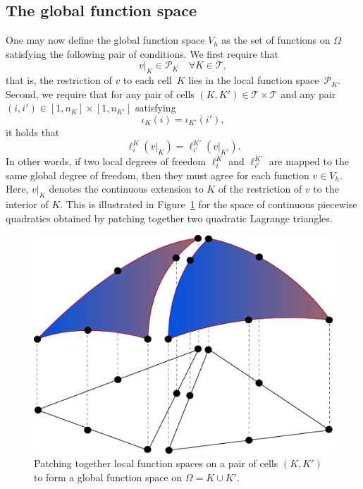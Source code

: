 \subsection{The global function space}

One may now define the global function space $V_h$ as the set of
functions on $\Omega$ satisfying the following pair of conditions. We
first require that
\begin{equation}
  v |_K \in \mathcal{P}_K \quad \forall K \in \mathcal{T},
\end{equation}
that is, the restriction of $v$ to each cell~$K$ lies in the local
function space~$\mathcal{P}_K$. Second, we require that for any pair
of cells $(K, K') \in \mathcal{T} \times \mathcal{T}$ and any
pair~$(i, i') \in [1,n_K] \times [1,n_{K'}]$ satisfying
\begin{equation}
  \iota_K(i) = \iota_{K'}(i'),
\end{equation}
it holds that
\begin{equation} \label{eq:constraint}
  \ell^K_i(v|_K) = \ell^{K'}_{i'}(v|_{K'}).
\end{equation}
In other words, if two local degrees of freedom $\ell^K_i$ and
$\ell^{K'}_{i'}$ are mapped to the same global degree of freedom, then
they must agree for each function $v \in V_h$. Here, $v|_K$ denotes
the continuous extension to $K$ of the restriction of $v$ to the
interior of $K$. This is illustrated in Figure~\ref{fig:femspace} for
the space of continuous piecewise quadratics obtained by patching
together two quadratic Lagrange triangles.

\begin{figure}
  \begin{center}
    \includegraphics[width=\largewidth]{chapters/kirby-7/eps/femspace.eps}
    \caption{Patching together local function spaces on a pair of
    cells $(K, K')$ to form a global function space on $\Omega = K
    \cup K'$.}
    \label{fig:femspace}
  \end{center}
\end{figure}

